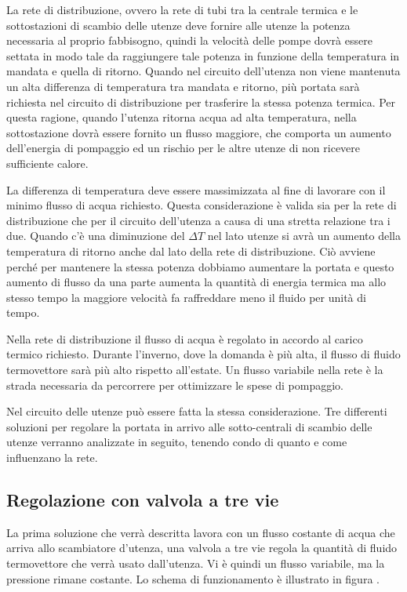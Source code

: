 \documentclass[laurea,oneside,11pt]{USiena_tesiLM}
\begin{document}

La rete di distribuzione, ovvero la rete di tubi tra la centrale termica e le sottostazioni di scambio delle utenze deve fornire alle utenze la potenza necessaria al proprio fabbisogno, quindi la velocità delle pompe dovrà essere settata in modo tale da raggiungere tale potenza in funzione della temperatura in mandata e quella di ritorno. Quando nel circuito dell'utenza non viene mantenuta un alta differenza di temperatura tra mandata e ritorno, più portata sarà richiesta nel circuito di distribuzione per trasferire la stessa potenza termica. Per questa ragione, quando l'utenza ritorna acqua ad alta temperatura, nella sottostazione dovrà essere fornito un flusso maggiore, che comporta un aumento dell'energia di pompaggio ed un rischio per le altre utenze di non ricevere sufficiente calore.

La differenza di temperatura deve essere massimizzata al fine di lavorare con il minimo flusso di acqua richiesto. Questa considerazione è valida sia per la rete di distribuzione che per il circuito dell'utenza a causa di una stretta relazione tra i due. 
Quando c'è una diminuzione del $\Delta T$ nel lato utenze si avrà un aumento della temperatura di ritorno anche dal lato della rete di distribuzione. Ciò avviene perché per mantenere la stessa potenza dobbiamo aumentare la portata e questo aumento di flusso da una parte aumenta la quantità di energia termica ma allo stesso tempo la maggiore velocità fa raffreddare meno il fluido per unità di tempo. 

Nella rete di distribuzione il flusso di acqua è regolato in accordo al carico termico richiesto. Durante l'inverno, dove la domanda è più alta, il flusso di fluido termovettore sarà più alto rispetto all'estate. Un flusso variabile nella rete è la strada necessaria da percorrere per ottimizzare le spese di pompaggio.

Nel circuito delle utenze può essere fatta la stessa considerazione. Tre differenti soluzioni per regolare la portata in arrivo alle sotto-centrali di scambio delle utenze verranno analizzate in seguito, tenendo condo di quanto e come influenzano la rete.

\subsection{Regolazione con valvola a tre vie}
La prima soluzione che verrà descritta lavora con un flusso costante di acqua che arriva allo scambiatore d'utenza, una valvola a tre vie regola la quantità di fluido termovettore che verrà usato dall'utenza. Vi è quindi un flusso variabile, ma la pressione rimane costante. Lo schema di funzionamento è illustrato in figura .
\end{document}
